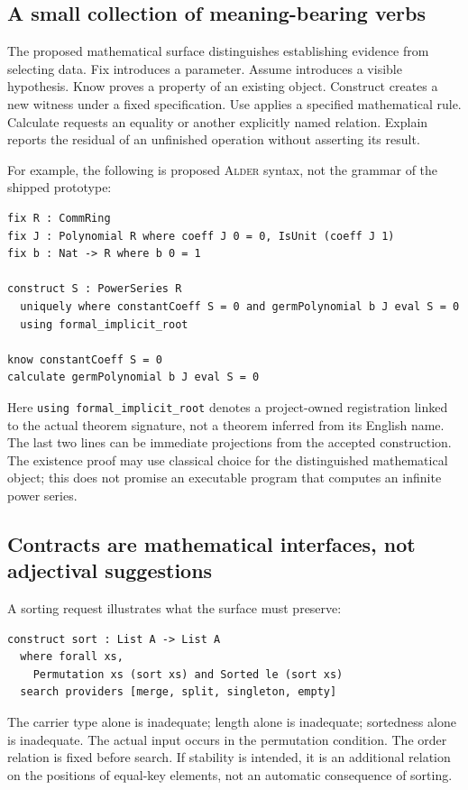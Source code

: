 \documentclass[11pt,a4paper]{article}
\newcommand{\code}[1]{\nolinkurl{#1}}
\newcommand{\Alder}{\textsc{Alder}}
\newcommand{\kw}[1]{\textsf{#1}}
\theoremstyle{plain}
\theoremstyle{definition}
\theoremstyle{remark}
\begin{document}
\subsection{A small collection of meaning-bearing verbs}
The proposed mathematical surface distinguishes establishing evidence from selecting data. \kw{Fix} introduces a parameter. \kw{Assume} introduces a visible hypothesis. \kw{Know} proves a property of an existing object. \kw{Construct} creates a new witness under a fixed specification. \kw{Use} applies a specified mathematical rule. \kw{Calculate} requests an equality or another explicitly named relation. \kw{Explain} reports the residual of an unfinished operation without asserting its result.

For example, the following is proposed \Alder{} syntax, not the grammar of the shipped prototype:
\Needspace{184pt}
\begin{lstlisting}
fix R : CommRing
fix J : Polynomial R where coeff J 0 = 0, IsUnit (coeff J 1)
fix b : Nat -> R where b 0 = 1

construct S : PowerSeries R
  uniquely where constantCoeff S = 0 and germPolynomial b J eval S = 0
  using formal_implicit_root

know constantCoeff S = 0
calculate germPolynomial b J eval S = 0
\end{lstlisting}
Here \code{using formal_implicit_root} denotes a project-owned registration linked to the actual theorem signature, not a theorem inferred from its English name. The last two lines can be immediate projections from the accepted construction. The existence proof may use classical choice for the distinguished mathematical object; this does not promise an executable program that computes an infinite power series.

\subsection{Contracts are mathematical interfaces, not adjectival suggestions}
A sorting request illustrates what the surface must preserve:
\Needspace{100pt}
\begin{lstlisting}
construct sort : List A -> List A
  where forall xs,
    Permutation xs (sort xs) and Sorted le (sort xs)
  search providers [merge, split, singleton, empty]
\end{lstlisting}
The carrier type alone is inadequate; length alone is inadequate; sortedness alone is inadequate. The actual input occurs in the permutation condition. The order relation is fixed before search. If stability is intended, it is an additional relation on the positions of equal-key elements, not an automatic consequence of sorting.
\end{document}
